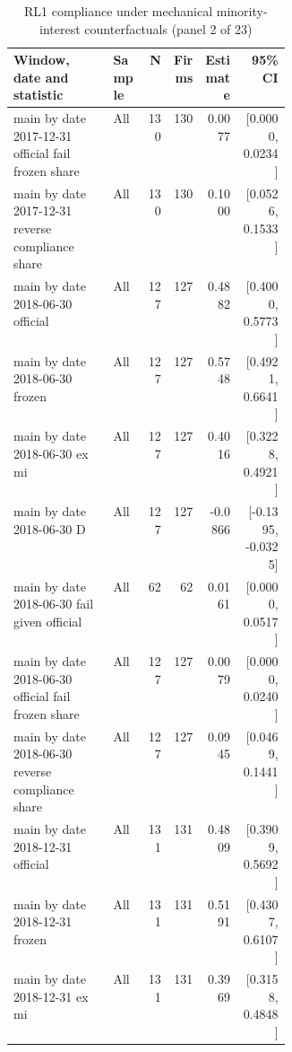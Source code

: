 \begin{table}[!htbp]\centering\scriptsize
\caption{RL1 compliance under mechanical minority-interest counterfactuals (panel 2 of 23)}
\begin{threeparttable}
\begin{tabular}{p{0.36\linewidth}lrrrr}
\toprule
Window, date and statistic & Sample & N & Firms & Estimate & 95\% CI \\
\midrule
main by date 2017-12-31 official fail frozen share & All & 130 & 130 & 0.0077 & [0.0000, 0.0234] \\
main by date 2017-12-31 reverse compliance share & All & 130 & 130 & 0.1000 & [0.0526, 0.1533] \\
main by date 2018-06-30 official & All & 127 & 127 & 0.4882 & [0.4000, 0.5773] \\
main by date 2018-06-30 frozen & All & 127 & 127 & 0.5748 & [0.4921, 0.6641] \\
main by date 2018-06-30 ex mi & All & 127 & 127 & 0.4016 & [0.3228, 0.4921] \\
main by date 2018-06-30 D & All & 127 & 127 & -0.0866 & [-0.1395, -0.0325] \\
main by date 2018-06-30 fail given official & All & 62 & 62 & 0.0161 & [0.0000, 0.0517] \\
main by date 2018-06-30 official fail frozen share & All & 127 & 127 & 0.0079 & [0.0000, 0.0240] \\
main by date 2018-06-30 reverse compliance share & All & 127 & 127 & 0.0945 & [0.0469, 0.1441] \\
main by date 2018-12-31 official & All & 131 & 131 & 0.4809 & [0.3909, 0.5692] \\
main by date 2018-12-31 frozen & All & 131 & 131 & 0.5191 & [0.4307, 0.6107] \\
main by date 2018-12-31 ex mi & All & 131 & 131 & 0.3969 & [0.3158, 0.4848] \\
\bottomrule
\end{tabular}
\begin{tablenotes}[flushleft]\footnotesize

\end{tablenotes}
\end{threeparttable}
\end{table}
